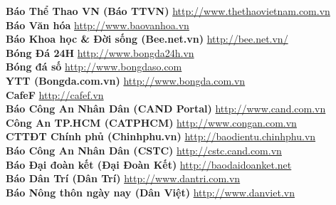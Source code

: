 \textbf{Báo Thể Thao VN (Báo TTVN)}  \hspace{0.5in} \href{http://www.thethaovietnam.com.vn}{http://www.thethaovietnam.com.vn} \\ 
\textbf{Báo Văn hóa}  \hspace{0.5in} \href{http://www.baovanhoa.vn}{http://www.baovanhoa.vn} \\ 
\textbf{Báo Khoa học & Đời sống (Bee.net.vn)}  \hspace{0.5in} \href{http://bee.net.vn/}{http://bee.net.vn/} \\ 
\textbf{Bóng Đá 24H}  \hspace{0.5in} \href{http://www.bongda24h.vn}{http://www.bongda24h.vn} \\ 
\textbf{Bóng đá số}  \hspace{0.5in} \href{http://www.bongdaso.com}{http://www.bongdaso.com} \\ 
\textbf{YTT (Bongda.com.vn)}  \hspace{0.5in} \href{http://www.bongda.com.vn}{http://www.bongda.com.vn} \\ 
\textbf{CafeF}  \hspace{0.5in} \href{http://cafef.vn}{http://cafef.vn} \\ 
\textbf{Báo Công An Nhân Dân (CAND Portal)}  \hspace{0.5in} \href{http://www.cand.com.vn}{http://www.cand.com.vn} \\ 
\textbf{Công An TP.HCM (CATPHCM)}  \hspace{0.5in} \href{http://www.congan.com.vn}{http://www.congan.com.vn} \\ 
\textbf{CTTĐT Chính phủ (Chinhphu.vn)}  \hspace{0.5in} \href{http://baodientu.chinhphu.vn}{http://baodientu.chinhphu.vn} \\ 
\textbf{Báo Công An Nhân Dân (CSTC)}  \hspace{0.5in} \href{http://cstc.cand.com.vn}{http://cstc.cand.com.vn} \\ 
\textbf{Báo Đại đoàn kết (Đại Đoàn Kết)}  \hspace{0.5in} \href{http://baodaidoanket.net}{http://baodaidoanket.net} \\ 
\textbf{Báo Dân Trí (Dân Trí)}  \hspace{0.5in} \href{http://www.dantri.com.vn}{http://www.dantri.com.vn} \\ 
\textbf{Báo Nông thôn ngày nay (Dân Việt)}  \hspace{0.5in} \href{http://www.danviet.vn}{http://www.danviet.vn} \\ 
